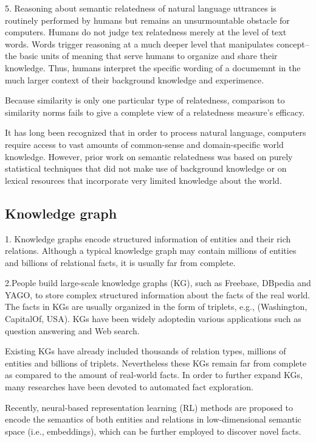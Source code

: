 5. Reasoning about semantic relatedness of natural language uttrances is routinely performed by 
humans but remains an unsurmountable obstacle for computers. Humans do not judge tex relatedness
merely at the level of text words. Words trigger reasoning at a much deeper level that manipulates
concept--the basic units of meaning that serve humans to organize and share their knowledge. Thus, 
humans interpret the specific wording of a documemnt in the much larger context of their background 
knowledge and experimence.

Because similarity is only one particular type of relatedness, comparison to 
similarity norms fails to give a complete view of a relatedness measure’s efficacy.

It has long been recognized that in order to process natural language, computers require access to 
vast amounts of common-sense and domain-specific world knowledge. However, prior work on semantic 
relatedness was based on purely statistical techniques that did not make use of background
knowledge or on lexical resources that incorporate very limited knowledge about the world.

\subsection{Knowledge graph} 
1. Knowledge graphs encode structured information of entities and their rich relations.
Although a typical knowledge graph may contain millions of entities and billions of 
relational facts, it is usually far from complete.

2.People build large-scale knowledge graphs (KG), such as Freebase, DBpedia and YAGO, 
to store complex structured information about the facts of the real world. The facts
in KGs are usually organized in the form of triplets, e.g., (Washington, CapitalOf, USA). 
KGs have been widely adoptedin various applications such as question answering and Web search.

Existing KGs have already included thousands of relation
types, millions of entities and billions of triplets. Nevertheless
these KGs remain far from complete as compared to the
amount of real-world facts. In order to further expand KGs,
many researches have been devoted to automated fact exploration.

Recently, neural-based representation learning (RL) methods
are proposed to encode the semantics of both entities
and relations in low-dimensional semantic space (i.e., embeddings),
which can be further employed to discover novel facts.

